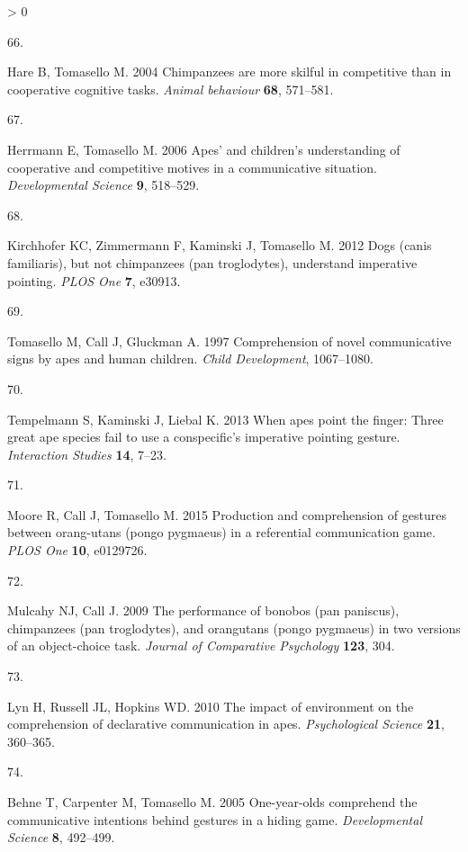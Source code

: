 \documentclass[
  english,
  man,floatsintext]{apa6}
\newlength{\cslhangindent}
\newlength{\csllabelwidth}
\newenvironment{CSLReferences}[2] %
 {%
  \setlength{\parindent}{0pt}
  \ifodd #1 \everypar{\setlength{\hangindent}{\cslhangindent}}\ignorespaces\fi
  \ifnum #2 > 0
  \setlength{\parskip}{#2\baselineskip}
  \fi
 }%
 {}
\newcommand{\CSLLeftMargin}[1]{\parbox[t]{\csllabelwidth}{#1}}
\newcommand{\CSLRightInline}[1]{\parbox[t]{\linewidth - \csllabelwidth}{#1}\break}
\begin{document}
\begin{CSLReferences}{0}{0}
\leavevmode\hypertarget{ref-hare2004chimpanzees}{}%
\CSLLeftMargin{66. }
\CSLRightInline{Hare B, Tomasello M. 2004 Chimpanzees are more skilful in competitive than in cooperative cognitive tasks. \emph{Animal behaviour} \textbf{68}, 571--581.}

\leavevmode\hypertarget{ref-herrmann2006apes}{}%
\CSLLeftMargin{67. }
\CSLRightInline{Herrmann E, Tomasello M. 2006 Apes' and children's understanding of cooperative and competitive motives in a communicative situation. \emph{Developmental Science} \textbf{9}, 518--529.}

\leavevmode\hypertarget{ref-kirchhofer2012dogs}{}%
\CSLLeftMargin{68. }
\CSLRightInline{Kirchhofer KC, Zimmermann F, Kaminski J, Tomasello M. 2012 Dogs (canis familiaris), but not chimpanzees (pan troglodytes), understand imperative pointing. \emph{PLOS One} \textbf{7}, e30913.}

\leavevmode\hypertarget{ref-tomasello1997comprehension}{}%
\CSLLeftMargin{69. }
\CSLRightInline{Tomasello M, Call J, Gluckman A. 1997 Comprehension of novel communicative signs by apes and human children. \emph{Child Development}, 1067--1080.}

\leavevmode\hypertarget{ref-tempelmann2013apes}{}%
\CSLLeftMargin{70. }
\CSLRightInline{Tempelmann S, Kaminski J, Liebal K. 2013 When apes point the finger: Three great ape species fail to use a conspecific's imperative pointing gesture. \emph{Interaction Studies} \textbf{14}, 7--23.}

\leavevmode\hypertarget{ref-moore2015production}{}%
\CSLLeftMargin{71. }
\CSLRightInline{Moore R, Call J, Tomasello M. 2015 Production and comprehension of gestures between orang-utans (pongo pygmaeus) in a referential communication game. \emph{PLOS One} \textbf{10}, e0129726.}

\leavevmode\hypertarget{ref-mulcahy2009performance}{}%
\CSLLeftMargin{72. }
\CSLRightInline{Mulcahy NJ, Call J. 2009 The performance of bonobos (pan paniscus), chimpanzees (pan troglodytes), and orangutans (pongo pygmaeus) in two versions of an object-choice task. \emph{Journal of Comparative Psychology} \textbf{123}, 304.}

\leavevmode\hypertarget{ref-lyn2010impact}{}%
\CSLLeftMargin{73. }
\CSLRightInline{Lyn H, Russell JL, Hopkins WD. 2010 The impact of environment on the comprehension of declarative communication in apes. \emph{Psychological Science} \textbf{21}, 360--365.}

\leavevmode\hypertarget{ref-behne2005one}{}%
\CSLLeftMargin{74. }
\CSLRightInline{Behne T, Carpenter M, Tomasello M. 2005 One-year-olds comprehend the communicative intentions behind gestures in a hiding game. \emph{Developmental Science} \textbf{8}, 492--499.}


\end{CSLReferences}
\end{document}
